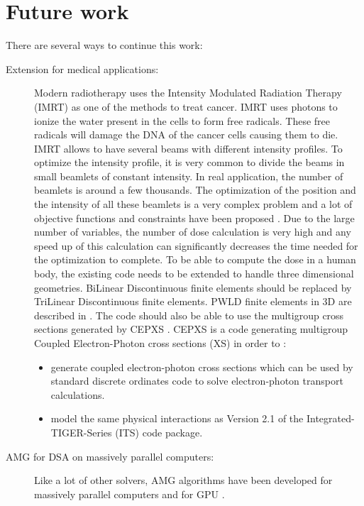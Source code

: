 \section{Future work}
There are several ways to continue this work:
\begin{description}
  \item[Extension for medical applications:] Modern radiotherapy uses the
    Intensity Modulated Radiation Therapy (IMRT) as one of the methods to
    treat cancer. IMRT uses photons to ionize the water present in the cells
    to form free radicals. These free radicals will damage the DNA of the
    cancer cells causing them to die. IMRT allows to have several beams with 
    different intensity  profiles. To optimize the intensity profile, it is 
    very common to divide the beams in small beamlets of constant intensity. 
    In real application, the number of beamlets is around a few thousands. 
    The optimization of the position and the intensity of all these beamlets
    is a very complex problem and a lot of objective functions and 
    constraints have been proposed \cite{math,complexity,minima,dose-volume}.
    Due to the large number of variables, the number of dose calculation is
    very high and any speed up of this calculation can significantly decreases
    the time needed for the optimization to complete.
    To be able to compute the dose in a human body, the existing code needs 
    to be extended to handle three dimensional geometries. BiLinear 
    Discontinuous finite elements should be replaced by TriLinear Discontinuous 
    finite elements. PWLD finite elements in 3D are described in \cite{pwld_3d}. 
    The code should also be able to use the multigroup cross sections generated by 
    CEPXS \cite{cepxs}. CEPXS is a code generating multigroup Coupled 
    Electron-Photon cross sections (XS) in order to \cite{cepxs}:
    \begin{itemize}
      \item generate coupled electron-photon cross sections which can be used by
        standard discrete ordinates code to solve electron-photon transport
        calculations.
      \item model the same physical interactions as Version 2.1 of the
        Integrated-TIGER-Series (ITS) code package.
    \end{itemize}
  \item[AMG for DSA on massively parallel computers:] Like a lot of other
    solvers, AMG algorithms have been developed for massively parallel
    computers \cite{amg_parallel,amg_multicore} and for GPU \cite{nvidia}.

\end{description}
